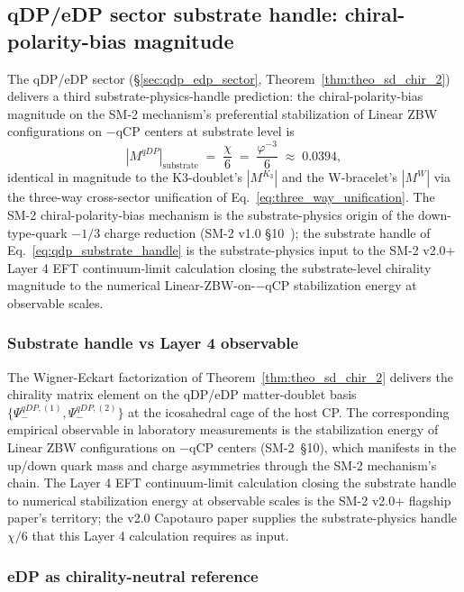 \documentclass[11pt,letterpaper]{article}
\newcommand{\phig}{\varphi}
\newcommand{\Kthree}{\ensuremath{K_3}}
\begin{document}
\subsection{qDP/eDP sector substrate handle: chiral-polarity-bias magnitude}\label{sec:qdp_edp_prediction}

The qDP/eDP sector (\S\ref{sec:qdp_edp_sector}, Theorem~\ref{thm:theo_sd_chir_2}) delivers a third substrate-physics-handle prediction: the chiral-polarity-bias magnitude on the SM-2 mechanism's preferential stabilization of Linear ZBW configurations on $-$qCP centers at substrate level is
\begin{equation}\label{eq:qdp_substrate_handle}
|M^{qDP}|_{\text{substrate}} \;=\; \frac{\chi}{6} \;=\; \frac{\phig^{-3}}{6} \;\approx\; 0.0394,
\end{equation}
identical in magnitude to the K3-doublet's $|M^{\Kthree}|$ and the W-bracelet's $|M^W|$ via the three-way cross-sector unification of Eq.~\eqref{eq:three_way_unification}. The SM-2 chiral-polarity-bias mechanism is the substrate-physics origin of the down-type-quark $-1/3$ charge reduction (SM-2 v1.0 \S10~\cite{abshier_sm2}); the substrate handle of Eq.~\eqref{eq:qdp_substrate_handle} is the substrate-physics input to the SM-2 v2.0+ Layer 4 EFT continuum-limit calculation closing the substrate-level chirality magnitude to the numerical Linear-ZBW-on-$-$qCP stabilization energy at observable scales.

\subsubsection{Substrate handle vs Layer 4 observable}\label{sec:qdp_layer4_distinction}

The Wigner-Eckart factorization of Theorem~\ref{thm:theo_sd_chir_2} delivers the chirality matrix element on the qDP/eDP matter-doublet basis $\{\Psi_-^{qDP,(1)}, \Psi_-^{qDP,(2)}\}$ at the icosahedral cage of the host CP. The corresponding empirical observable in laboratory measurements is the stabilization energy of Linear ZBW configurations on $-$qCP centers (SM-2~\S10), which manifests in the up/down quark mass and charge asymmetries through the SM-2 mechanism's chain. The Layer 4 EFT continuum-limit calculation closing the substrate handle to numerical stabilization energy at observable scales is the SM-2 v2.0+ flagship paper's territory; the v2.0 Capotauro paper supplies the substrate-physics handle $\chi/6$ that this Layer 4 calculation requires as input.

\subsubsection{eDP as chirality-neutral reference}\label{sec:edp_neutral_reference}
\end{document}
